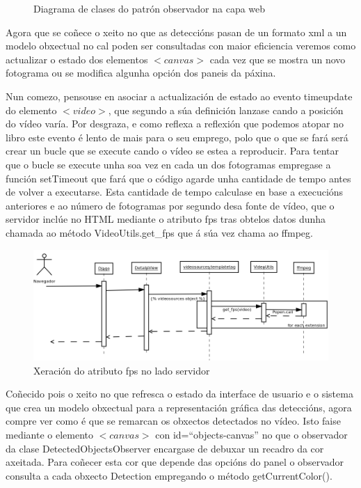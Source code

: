 \begin{figure}[htp]
\begin{center}
        \caption{Diagrama de clases do patrón observador na capa web}
    \label{fig:CapaWebJS}
    \end{center}
    \end{figure}
    
    Agora que se coñece o xeito no que as deteccións pasan de un formato xml a un modelo obxectual 
    no cal poden ser consultadas con maior eficiencia veremos como actualizar o estado dos elementos
    $<canvas>$ cada vez que se mostra un novo fotograma ou se modifica algunha opción dos paneis da
    páxina.
    
    Nun comezo, pensouse en asociar a actualización de estado ao evento timeupdate do elemento 
    $<video>$, que segundo a súa definición lanzase cando a posición do vídeo varía. Por desgraza, 
    e como reflexa a reflexión que podemos atopar no libro \cite[Capítulo 6.1]{video-con-html5}
    este evento é lento de mais para o seu emprego, polo que o que se fará será
    crear un bucle que se execute cando o vídeo se estea a reproducir. Para tentar que o bucle se 
    execute unha soa vez en cada un dos fotogramas empregase a función setTimeout que fará que o 
    código agarde unha cantidade de tempo antes de volver a executarse. Esta cantidade de tempo 
    calculase en base a execucións anteriores e ao número de fotogramas por segundo desa fonte de 
    vídeo, que o servidor inclúe no HTML mediante o atributo fps tras obtelos datos dunha chamada ao
    método VideoUtils.get\_fps que á súa vez chama ao ffmpeg.
    
    \begin{figure}[htp]
    \begin{center}
        \includegraphics[scale=0.2]{figures/GenerateFpsDjango.png}
        \caption{Xeración do atributo fps no lado servidor}
    \label{fig:GenerateFpsDjango}
    \end{center}
    \end{figure}
    
    Coñecido pois o xeito no que refresca o estado da interface de usuario e o sistema que crea un 
    modelo obxectual para a representación gráfica das deteccións, agora compre ver como é que se 
    remarcan os obxectos detectados no vídeo. Isto faise mediante o elemento $<canvas>$ con
    id=``objects-canvas'' no que o observador da clase DetectedObjectsObserver encargase de debuxar
    un recadro da cor axeitada. Para coñecer esta cor que depende das opcións do panel o observador
    consulta a cada obxecto Detection empregando o método getCurrentColor().
    
